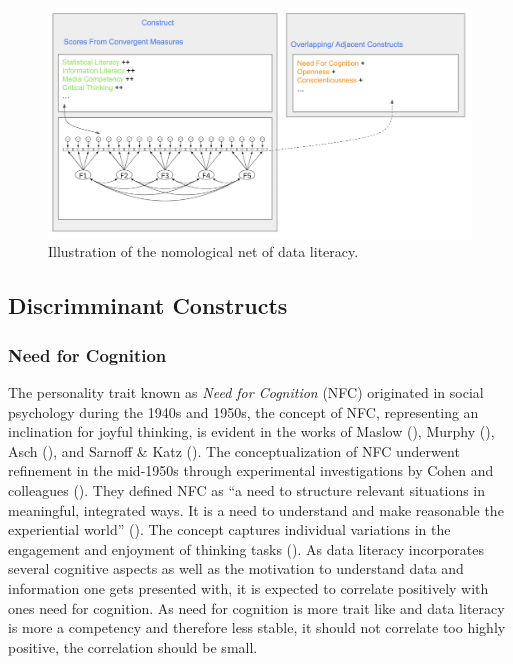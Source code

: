 \documentclass[
  12pt,
  a4paper,
  twoside]{article}
\begin{document}
\begin{figure}

{\centering \includegraphics[width=1\linewidth]{images/DL_NomNet} 

}

\caption{Illustration of the nomological net of data literacy.  }\label{fig:nomnet}
\end{figure}

\subsection{Discrimminant Constructs}\label{discrimminant-constructs}

\subsubsection{Need for Cognition}\label{need-for-cognition}

The personality trait known as \emph{Need for Cognition} (NFC) originated in social psychology during the 1940s and 1950s, the concept of NFC, representing an inclination for joyful thinking, is evident in the works of Maslow (), Murphy (), Asch (), and Sarnoff \& Katz (). The conceptualization of NFC underwent refinement in the mid-1950s through experimental investigations by Cohen and colleagues (). They defined NFC as ``a need to structure relevant situations in meaningful, integrated ways. It is a need to understand and make reasonable the experiential world'' (). The concept captures individual variations in the engagement and enjoyment of thinking tasks (). As data literacy incorporates several cognitive aspects as well as the motivation to understand data and information one gets presented with, it is expected to correlate positively with ones need for cognition. As need for cognition is more trait like and data literacy is more a competency and therefore less stable, it should not correlate too highly positive, the correlation should be small.
\end{document}
